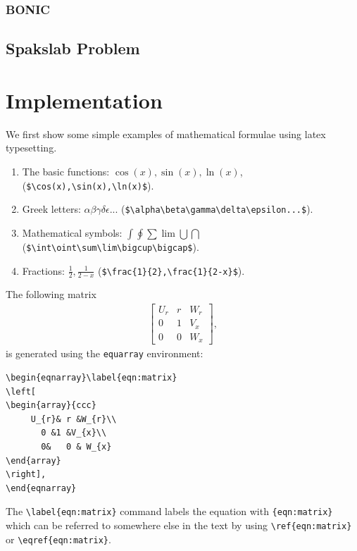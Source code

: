 \documentclass[11pt]{book}
\begin{document}
\subsection{BONIC}
\section{Spakslab Problem}

\chapter{Implementation}
We first show  some simple examples of 
mathematical formulae using latex typesetting.

\begin{enumerate}
\item The basic functions: $\cos(x),  \sin(x),   \ln(x) $,  (\verb+$\cos(x),\sin(x),\ln(x)$+). 
\item Greek letters: $\alpha \beta \gamma \delta\epsilon...$ (\verb+$\alpha\beta\gamma\delta\epsilon...$+).
\item Mathematical symbols: $\int  \oint \sum\lim\bigcup \bigcap$
 (\verb+$\int\oint\sum\lim\bigcup\bigcap$+).
\item Fractions: $\frac{1}{2},\frac{1}{2-x}$ (\verb+$\frac{1}{2},\frac{1}{2-x}$+).
\end{enumerate}

The following matrix 
\begin{eqnarray}\label{eqn:matrix}
\left[
\begin{array}{ccc}
	 U_{r}&     r       &   W_{r}	\\
	   0       &	1      &  V_{x}	\\
	   0	   &	0      &  W_{x}
\end{array}
\right], 
\end{eqnarray}
is generated using  the \verb+equarray+ environment:
\begin{verbatim}
\begin{eqnarray}\label{eqn:matrix}
\left[
\begin{array}{ccc}
	 U_{r}& r &W_{r}\\
	   0 &1 &V_{x}\\
	   0&	0 & W_{x}
\end{array}
\right], 
\end{eqnarray}
\end{verbatim}
The \verb+\label{eqn:matrix}+ command labels the equation with \verb+{eqn:matrix}+ which can 
be referred  to somewhere else in the text by using \verb+\ref{eqn:matrix}+ or  \verb+\eqref{eqn:matrix}+.
\end{document}
